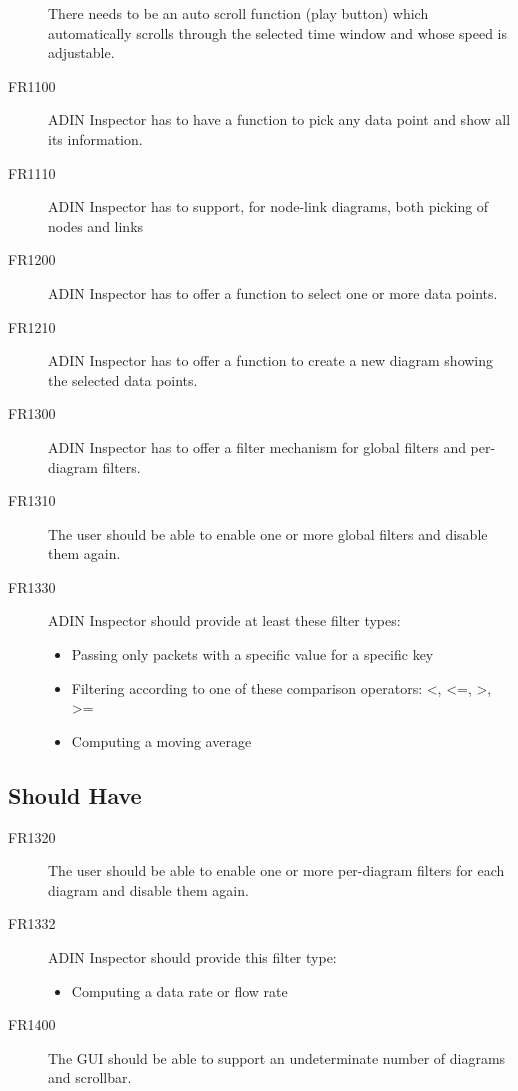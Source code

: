 \documentclass[twoside, english, final]{Pflichtenheft}
\begin{document}
\begin{description}
	      There needs to be an auto scroll function (play button) which automatically scrolls through the selected time window and whose speed is adjustable.
	\item[FR1100]
	      ADIN Inspector has to have a function to pick any data point and show all its information.
	\item[FR1110]
	      ADIN Inspector has to support, for node-link diagrams, both picking of nodes and links
	\item[FR1200]
	      ADIN Inspector has to offer a function to select one or more data points.
	\item[FR1210]
	      ADIN Inspector has to offer a function to create a new diagram showing the selected data points.

	\item[FR1300]
	      ADIN Inspector has to offer a filter mechanism for global filters and per-diagram filters.

	\item[FR1310]
	      The user should be able to enable one or more global filters and disable them again.

	\item[FR1330]
	      ADIN Inspector should provide at least these filter types:
	      \begin{itemize}
		      \item{Passing only packets with a specific value for a specific key}
		      \item{Filtering according to one of these comparison operators: <, <=, >, >=}
		      \item{Computing a moving average}
	      \end{itemize}

\end{description}

\subsection{Should Have}
\begin{description}
	\item[FR1320]
	      The user should be able to enable one or more per-diagram filters for each diagram and disable them again.

	\item[FR1332]
	      ADIN Inspector should provide this filter type:
	      \begin{itemize}
		\item[]Computing a data rate or flow rate
	      \end{itemize}

	\item[FR1400]
	      The GUI should be able to support an undeterminate number of diagrams and scrollbar.
\end{description}
\end{document}
